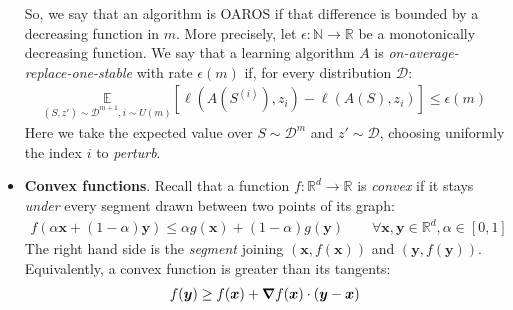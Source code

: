 \documentclass[../template.tex]{subfiles}
\begin{document}
\begin{itemize}
    So, we say that an algorithm is OAROS if that difference is bounded by a decreasing function in $m$. More precisely, let $\epsilon\colon \mathbb{N} \to \mathbb{R}$ be a monotonically decreasing function. We say that a learning algorithm $A$ is \textit{on-average-replace-one-stable} with rate $\epsilon(m)$ if, for every distribution $\mathcal{D}$:
    \begin{align*}
        \underset{(S, z') \sim \mathcal{D}^{m+1}, i \sim U(m)}{\mathbb{E}} [\ell(A(S^{(i)}), z_i) - \ell(A(S), z_i)] \leq \epsilon(m)
    \end{align*}  
    Here we take the expected value over $S \sim \mathcal{D}^m$ and $z' \sim \mathcal{D}$, choosing uniformly the index $i$ to \textit{perturb}.  
    \item \textbf{Convex functions}.
    Recall that a function $f\colon \mathbb{R}^d \to \mathbb{R}$ is \textit{convex} if it stays \textit{under} every segment drawn between two points of its graph:
    \begin{align}
        f(\alpha \bm{x} + (1-\alpha)\bm{y}) \leq \alpha g(\bm{x}) + (1- \alpha) g(\bm{y}) \qquad \forall \bm{x}, \bm{y} \in \mathbb{R}^d, \alpha \in [0,1] \label{eqn:convex-def1}
    \end{align} 
    The right hand side is the \textit{segment} joining $(\bm{x}, f(\bm{x}))$ and $(\bm{y}, f(\bm{y}))$. Equivalently, a convex function is greater than its tangents:
    \begin{align*}
        f(\bm{y}) \geq f(\bm{x}) + \grad f(\bm{x}) \cdot (\bm{y} - \bm{x})
    \end{align*}


\end{itemize}
\end{document}
